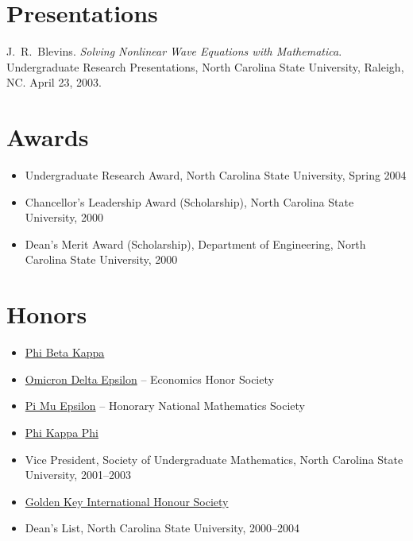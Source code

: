 \documentclass[overlapped,line,draft,11pt,letterpaper]{res}
\begin{document}
\begin{resume}

\section{\bf Presentations}

J.\ R.\ Blevins. {\em Solving Nonlinear Wave Equations with
  Mathematica}. Undergraduate Research Presentations, North Carolina
State University, Raleigh, NC. April 23, 2003.



\section{\bf Awards}

\begin{itemize}
\item Undergraduate Research Award, North Carolina State University,
  Spring 2004
\item Chancellor's Leadership Award (Scholarship), North Carolina State
  University, 2000
\item Dean's Merit Award (Scholarship), Department of Engineering, North
  Carolina State University, 2000
\end{itemize}


\section{\bf Honors}
\begin{itemize}
\item \href{http://www.pbk.org/}{Phi Beta Kappa}
\item \href{http://www.cba.ua.edu/~ode/}
  {Omicron Delta Epsilon} -- Economics Honor Society
\item \href{http://www.pme-math.org/}
  {Pi Mu Epsilon} -- Honorary National Mathematics Society
\item \href{http://www.phikappaphi.org/}{Phi Kappa Phi}
\item Vice President, Society of Undergraduate Mathematics, North
  Carolina State University, 2001--2003
\item \href{http://www.goldenkey.org}{Golden Key International Honour Society}
\item Dean's List, North Carolina State University, 2000--2004
\end{itemize}


\end{resume}
\end{document}

